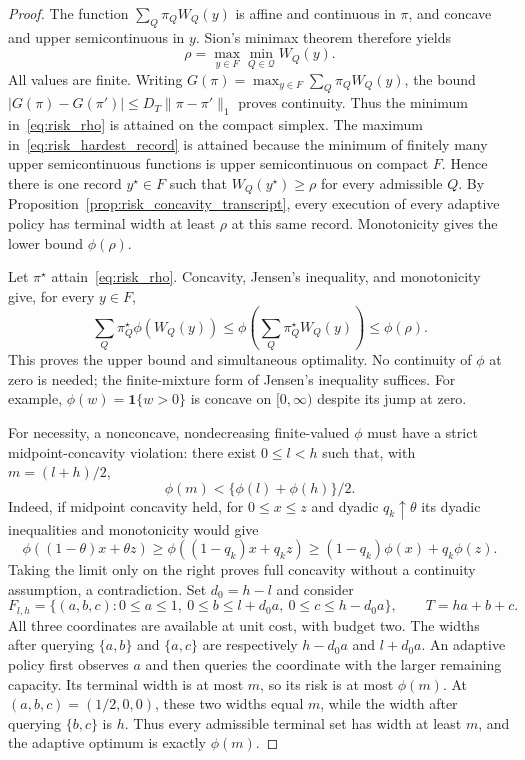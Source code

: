 \begin{proof}
The function $\sum_Q\pi_QW_Q(y)$ is affine and continuous in $\pi$,
and concave and upper semicontinuous in $y$. Sion's minimax theorem \citep{sion1958}
therefore yields
\begin{equation}
 \rho=\max_{y\in F}\min_{Q\in\mathcal Q}W_Q(y).
 \label{eq:risk_hardest_record}
\end{equation}
All values are finite. Writing $G(\pi)=\max_{y\in F}\sum_Q\pi_QW_Q(y)$,
the bound $|G(\pi)-G(\pi')|\le D_T\|\pi-\pi'\|_1$ proves continuity.
Thus the minimum in~\eqref{eq:risk_rho} is attained on the compact simplex.
The maximum in~\eqref{eq:risk_hardest_record} is attained because the
minimum of finitely many upper semicontinuous functions is upper
semicontinuous on compact $F$. Hence there is one record $y^\star\in F$
such that $W_Q(y^\star)\ge\rho$ for every admissible $Q$.
By Proposition~\ref{prop:risk_concavity_transcript}, every execution of
every adaptive policy has terminal width at least $\rho$ at this same
record. Monotonicity gives the lower bound $\phi(\rho)$.

Let $\pi^\star$ attain~\eqref{eq:risk_rho}. Concavity, Jensen's
inequality, and monotonicity give, for every $y\in F$,
\[
 \sum_Q\pi^\star_Q\phi(W_Q(y))
 \le \phi\!\left(\sum_Q\pi^\star_QW_Q(y)\right)
 \le\phi(\rho).
\]
This proves the upper bound and simultaneous optimality. No continuity
of $\phi$ at zero is needed; the finite-mixture form of Jensen's
inequality suffices. For example, $\phi(w)=\boldsymbol{1}\{w>0\}$ is
concave on $[0,\infty)$ despite its jump at zero.

For necessity, a nonconcave, nondecreasing finite-valued $\phi$ must
have a strict midpoint-concavity violation: there exist $0\le l<h$ such
that, with $m=(l+h)/2$,
\begin{equation}
 \phi(m)<\{\phi(l)+\phi(h)\}/2.
 \label{eq:risk_midpoint_violation}
\end{equation}
Indeed, if midpoint concavity held, for $0\le x\le z$ and dyadic
$q_k\uparrow\theta$ its dyadic inequalities and monotonicity would give
\[
\phi((1-\theta)x+\theta z)
\ge\phi((1-q_k)x+q_kz)
\ge(1-q_k)\phi(x)+q_k\phi(z).
\]
Taking the limit only on the right proves full concavity without a
continuity assumption, a contradiction. Set $d_0=h-l$ and consider
\begin{equation}
 F_{l,h}=\{(a,b,c):0\le a\le1,\ 0\le b\le l+d_0a,
                  \ 0\le c\le h-d_0a\},\qquad T=ha+b+c.
 \label{eq:risk_converse_polytope}
\end{equation}
All three coordinates are available at unit cost, with budget two.
The widths after querying $\{a,b\}$ and $\{a,c\}$ are respectively
$h-d_0a$ and $l+d_0a$. An adaptive policy first observes $a$ and then
queries the coordinate with the larger remaining capacity. Its terminal
width is at most $m$, so its risk is at most $\phi(m)$.
At $(a,b,c)=(1/2,0,0)$, these two widths equal $m$, while the width
after querying $\{b,c\}$ is $h$. Thus every admissible terminal set
has width at least $m$, and the adaptive optimum is exactly $\phi(m)$.


\end{proof}
